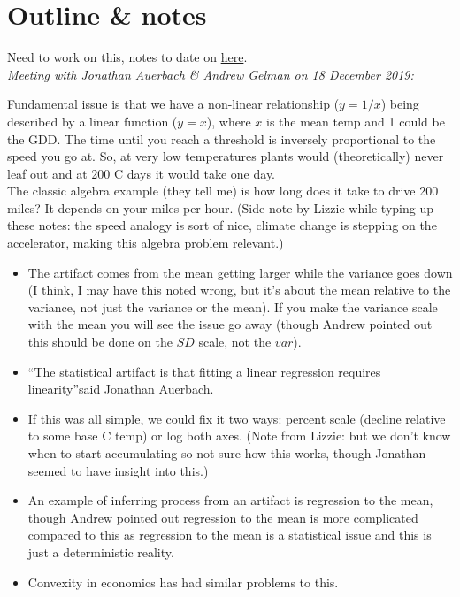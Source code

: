 \documentclass[11pt,letter]{article}
\begin{document}
\section{Outline \& notes}

Need to work on this, notes to date on \href{https://github.com/lizzieinvancouver/decsens/wiki/Statistical-artifacts-in-sensitivities}{here}.\\

\emph{Meeting with Jonathan Auerbach \& Andrew Gelman on 18 December 2019:} 

Fundamental issue is that we have a non-linear relationship ($y=1/x$) being described by a linear function ($y=x$), where $x$ is the mean temp and 1 could be the GDD. The time until you reach a threshold is inversely proportional to the speed you go at. So, at very low temperatures plants would (theoretically) never leaf out and at 200 C days it would take one day. \\

The classic algebra example (they tell me) is how long does it take to drive 200 miles? It depends on your miles per hour. (Side note by Lizzie while typing up these notes: the speed analogy is sort of nice, climate change is stepping on the accelerator, making this algebra problem relevant.)

\begin{itemize}
\item The artifact comes from the mean getting larger while the variance goes down (I think, I may have this noted wrong, but it's about the mean relative to the variance, not just the variance or the mean). If you make the variance scale with the mean you will see the issue go away (though Andrew pointed out this should be done on the $SD$ scale, not the $var$).
\item ``The statistical artifact is that fitting a linear regression requires linearity''said  Jonathan Auerbach.
\item If this was all simple, we could fix it two ways: percent scale (decline relative to some base C temp) or log both axes. (Note from Lizzie: but we don't know when to start accumulating so not sure how this works, though Jonathan seemed to have insight into this.)
\item An example of inferring process from an artifact is regression to the mean, though Andrew pointed out regression to the mean is more complicated compared to this as regression to the mean is a statistical issue and this is just a deterministic reality. 
\item Convexity in economics has had similar problems to this. 
\end{itemize}
\end{document}
